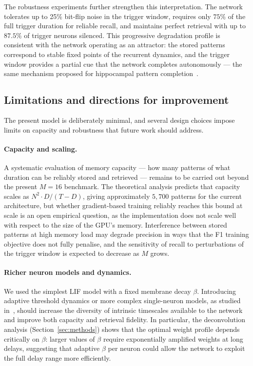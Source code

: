 \documentclass{scrartcl}
\newcommand{\citep}[1]{\parencite{#1}}
\newcommand{\citet}[1]{\textcite{#1}}
\begin{document}


The robustness experiments further strengthen this interpretation. The network tolerates up to 25\% bit-flip noise in the trigger window, requires only $75\%$ of the full trigger duration for reliable recall, and maintains perfect retrieval with up to $87.5\%$ of trigger neurons silenced. This progressive degradation profile is consistent with the network operating as an attractor: the stored patterns correspond to stable fixed points of the recurrent dynamics, and the trigger window provides a partial cue that the network completes autonomously --- the same mechanism proposed for hippocampal pattern completion~\citep{Villette2015}.

\subsection{Limitations and directions for improvement}

The present model is deliberately minimal, and several design choices impose limits on capacity and robustness that future work should address.

\paragraph{Capacity and scaling.}
A systematic evaluation of memory capacity --- how many patterns of what duration can be reliably stored and retrieved --- remains to be carried out beyond the present $M=16$ benchmark. The theoretical analysis predicts that capacity scales as $N^2 \cdot D / (T-D)$, giving approximately $5{,}700$ patterns for the current architecture, but whether gradient-based training reliably reaches this bound at scale is an open empirical question, as the implementation does not scale well with respect to the size of the GPU's memory. Interference between stored patterns at high memory load may degrade precision in ways that the F1 training objective does not fully penalise, and the sensitivity of recall to perturbations of the trigger window is expected to decrease as $M$ grows.

\paragraph{Richer neuron models and dynamics.}
We used the simplest LIF model with a fixed membrane decay $\beta$. Introducing adaptive threshold dynamics or more complex single-neuron models, as studied in~\citet{Szatmary2010}, should increase the diversity of intrinsic timescales available to the network and improve both capacity and retrieval fidelity. In particular, the deconvolution analysis (Section~\ref{sec:methods}) shows that the optimal weight profile depends critically on $\beta$: larger values of $\beta$ require exponentially amplified weights at long delays, suggesting that adaptive $\beta$ per neuron could allow the network to exploit the full delay range more efficiently.
\end{document}
